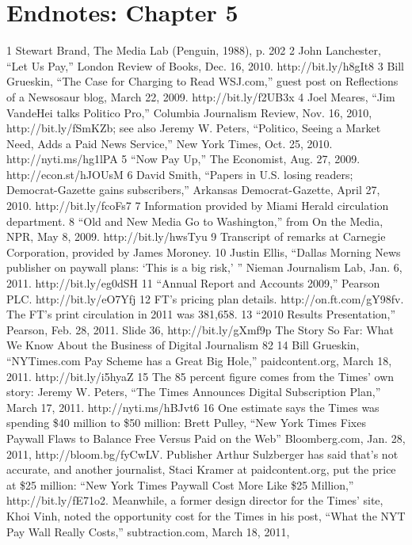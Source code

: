 \section{Endnotes: Chapter 5}
1 Stewart Brand, The Media Lab (Penguin, 1988), p. 202
2 John Lanchester, ``Let Us Pay,'' London Review of Books, Dec. 16, 2010. http://bit.ly/h8gIt8
3 Bill Grueskin, ``The Case for Charging to Read WSJ.com,'' guest post on Reflections of a
Newsosaur blog, March 22, 2009. http://bit.ly/f2UB3x
4 Joel Meares, ``Jim VandeHei talks Politico Pro,'' Columbia Journalism Review, Nov. 16, 2010,
http://bit.ly/fSmKZb; see also Jeremy W. Peters, ``Politico, Seeing a Market Need, Adds a Paid
News Service,'' New York Times, Oct. 25, 2010. http://nyti.ms/hg1lPA
5 ``Now Pay Up,'' The Economist, Aug. 27, 2009. http://econ.st/hJOUsM
6 David Smith, ``Papers in U.S. losing readers; Democrat-Gazette gains subscribers,''
Arkansas Democrat-Gazette, April 27, 2010. http://bit.ly/fcoFs7
7 Information provided by Miami Herald circulation department.
8 ``Old and New Media Go to Washington,'' from On the Media, NPR, May 8, 2009.
http://bit.ly/hwsTyu
9 Transcript of remarks at Carnegie Corporation, provided by James Moroney.
10 Justin Ellis, ``Dallas Morning News publisher on paywall plans: ‘This is a big risk,’ '' Nieman
Journalism Lab, Jan. 6, 2011. http://bit.ly/eg0dSH
11 ``Annual Report and Accounts 2009,'' Pearson PLC. http://bit.ly/eO7Yfj
12 FT’s pricing plan details. http://on.ft.com/gY98fv. The FT’s print circulation in 2011
was 381,658.
13 ``2010 Results Presentation,'' Pearson, Feb. 28, 2011. Slide 36, http://bit.ly/gXmf9p
The Story So Far: What We Know About the Business of Digital Journalism
82
14 Bill Grueskin, ``NYTimes.com Pay Scheme has a Great Big Hole,'' paidcontent.org,
March 18, 2011. http://bit.ly/i5hyaZ
15 The 85 percent figure comes from the Times’ own story: Jeremy W. Peters, ``The Times
Announces Digital Subscription Plan,'' March 17, 2011. http://nyti.ms/hBJvt6
16 One estimate says the Times was spending \$40 million to \$50 million: Brett Pulley, ``New
York Times Fixes Paywall Flaws to Balance Free Versus Paid on the Web'' Bloomberg.com,
Jan. 28, 2011, http://bloom.bg/fyCwLV. Publisher Arthur Sulzberger has said that’s not
accurate, and another journalist, Staci Kramer at paidcontent.org, put the price at \$25 million:
``New York Times Paywall Cost More Like \$25 Million,'' http://bit.ly/fE71o2. Meanwhile,
a former design director for the Times’ site, Khoi Vinh, noted the opportunity cost for the
Times in his post, ``What the NYT Pay Wall Really Costs,'' subtraction.com, March 18, 2011,
